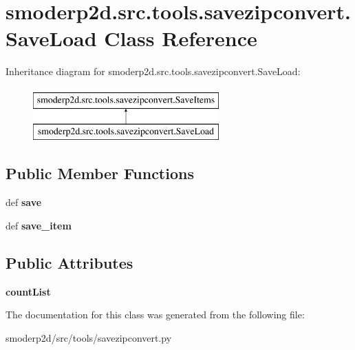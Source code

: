 \hypertarget{classsmoderp2d_1_1src_1_1tools_1_1savezipconvert_1_1SaveLoad}{\section{smoderp2d.\-src.\-tools.\-savezipconvert.\-Save\-Load Class Reference}
\label{classsmoderp2d_1_1src_1_1tools_1_1savezipconvert_1_1SaveLoad}
}
Inheritance diagram for smoderp2d.\-src.\-tools.\-savezipconvert.\-Save\-Load\-:\begin{figure}[H]
\begin{center}
\leavevmode
\includegraphics[height=2.000000cm]{classsmoderp2d_1_1src_1_1tools_1_1savezipconvert_1_1SaveLoad}
\end{center}
\end{figure}
\subsection*{Public Member Functions}
\begin{DoxyCompactItemize}
\item 
\hypertarget{classsmoderp2d_1_1src_1_1tools_1_1savezipconvert_1_1SaveLoad_a054ff307ab4f5403c31243f9d00eb953}{def {\bfseries save}}\label{classsmoderp2d_1_1src_1_1tools_1_1savezipconvert_1_1SaveLoad_a054ff307ab4f5403c31243f9d00eb953}

\item 
\hypertarget{classsmoderp2d_1_1src_1_1tools_1_1savezipconvert_1_1SaveLoad_a3ab39289191759cf2f7159c9dca7f83a}{def {\bfseries save\-\_\-item}}\label{classsmoderp2d_1_1src_1_1tools_1_1savezipconvert_1_1SaveLoad_a3ab39289191759cf2f7159c9dca7f83a}

\end{DoxyCompactItemize}
\subsection*{Public Attributes}
\begin{DoxyCompactItemize}
\item 
\hypertarget{classsmoderp2d_1_1src_1_1tools_1_1savezipconvert_1_1SaveLoad_af128345f0d5fc0833600801586caebe8}{{\bfseries count\-List}}\label{classsmoderp2d_1_1src_1_1tools_1_1savezipconvert_1_1SaveLoad_af128345f0d5fc0833600801586caebe8}

\end{DoxyCompactItemize}


The documentation for this class was generated from the following file\-:\begin{DoxyCompactItemize}
\item 
smoderp2d/src/tools/savezipconvert.\-py\end{DoxyCompactItemize}
